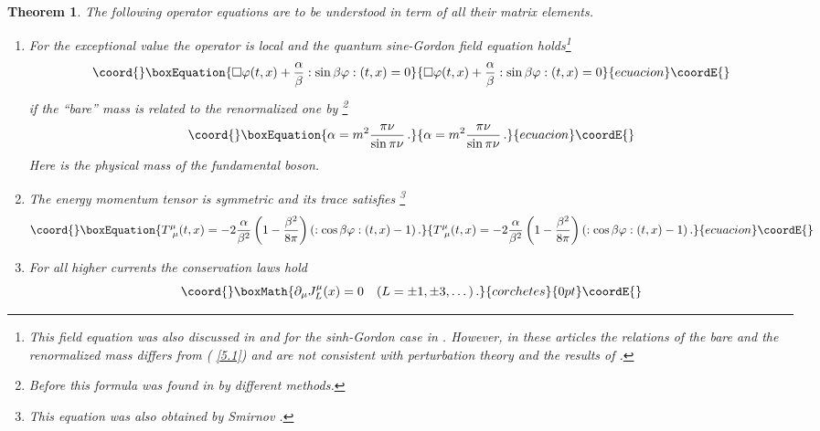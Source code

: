 \documentclass[a4paper,a4paper]{article}
\newtheorem{theorem}{Theorem}
\begin{document}
\begin{theorem}
\label{t4}The following operator equations are to be understood in term of
all their matrix elements.

\begin{enumerate}
\item  For the exceptional value \myHighlight{$\gamma =\beta $}\coordHE{} the operator \coordHE{} is local and the quantum sine-Gordon field
equation holds\footnote{\label{c1}This field equation was also discussed in 
\cite{Sm1} and for the sinh-Gordon case in \cite{MS}. However, in these
articles the relations of the bare and the renormalized mass differs from (%
\ref{5.1}) and are not consistent with perturbation theory and the results
of \cite{Fa,AlZa}.} 
\begin{equation}\coord{}\boxEquation{
\square \varphi (t,x)+\frac{\alpha }{\beta }:\sin \beta \varphi :(t,x)=0
\label{e}
}{
\square \varphi (t,x)+\frac{\alpha }{\beta }:\sin \beta \varphi :(t,x)=0
}{ecuacion}\coordE{}\end{equation}
if the ``bare'' mass \myHighlight{$\sqrt{\alpha }$}\coordHE{} is related to the renormalized one by%
\footnote{%
Before this formula was found in \cite{Fa,AlZa} by different methods.} 
\begin{equation}\coord{}\boxEquation{
\alpha =m^{2}\frac{\pi \nu }{\sin \pi \nu }\,.  \label{5.1}
}{
\alpha =m^{2}\frac{\pi \nu }{\sin \pi \nu }\,.  }{ecuacion}\coordE{}\end{equation}
Here \coordHE{} is the physical mass of the fundamental boson.

\item  The energy momentum tensor is symmetric and its trace satisfies%
\footnote{%
This equation was also obtained by Smirnov \cite{Sm1}.} 
\begin{equation}\coord{}\boxEquation{
T_{~\mu }^{\mu }(t,x)=-2\frac{\alpha }{\beta ^{2}}\left( 1-\frac{\beta ^{2}}{
8\pi }\right) \left( :\cos \beta \varphi :(t,x)-1\right) .  \label{T}
}{
T_{~\mu }^{\mu }(t,x)=-2\frac{\alpha }{\beta ^{2}}\left( 1-\frac{\beta ^{2}}{
8\pi }\right) \left( :\cos \beta \varphi :(t,x)-1\right) .  }{ecuacion}\coordE{}\end{equation}

\item  For all higher currents the conservation laws hold 
\[\coord{}\boxMath{
\partial _{\mu }J_{L}^{\mu }(x)=0\quad (L=\pm 1,\pm 3,\dots )\,.
}{corchetes}{0pt}\coordE{}\]
\end{enumerate}
\end{theorem}
\end{document}
